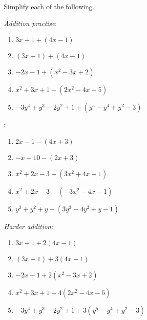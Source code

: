 \begin{myexample}
Simplify each of the following.
\end{myexample}
\begin{myProof}
	\drillandskill
	{\em Addition practise}:
	\begin{enumerate}
		\item $3x+1+(4x-1)$ 
		\item $(3x+1)+(4x-1)$ 
		\item $-2x-1+(x^2-3x+2)$ 
		\item $x^2+3x+1+(2x^2-4x-5)$ 
		\item $-3y^4+y^3-2y^2+1+ (y^5-y^4+y^2-3)$ 
	\end{enumerate}
	:
	\begin{enumerate}
		\item $2x-1 - (4x+3)$ 
		\item $-x+10 - (2x+3)$ 
		\item $x^2+2x-3 - (3x^2+4x+1)$ 
		\item $x^2+2x-3 - (-3x^2-4x-1)$ 
		\item $y^3+y^2+y - (3y^3-4y^2+y-1)$ 
	\end{enumerate}
	{\em Harder addition}:
	\begin{enumerate}
		\item $3x+1+2(4x-1)$ 
		\item $(3x+1)+3(4x-1)$ 
		\item $-2x-1+2(x^2-3x+2)$ 
		\item $x^2+3x+1+4(2x^2-4x-5)$ 
		\item $-3y^4+y^3-2y^2+1+ 3(y^5-y^4+y^2-3)$ 
	\end{enumerate}
\end{myProof} 

